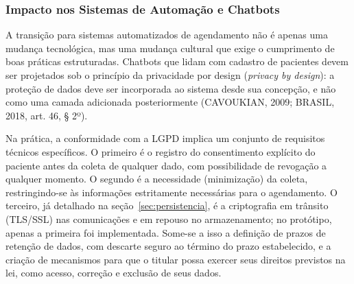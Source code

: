 \documentclass[12pt,a4paper]{extarticle}
\begin{document}
\subsubsection{Impacto nos Sistemas de Automação e Chatbots}
\label{sec:lgpd-impacto}

A transição para sistemas automatizados de agendamento não é apenas uma mudança tecnológica, mas uma mudança cultural que exige o cumprimento de boas práticas estruturadas. Chatbots que lidam com cadastro de pacientes devem ser projetados sob o princípio da privacidade por design (\textit{privacy by design}): a proteção de dados deve ser incorporada ao sistema desde sua concepção, e não como uma camada adicionada posteriormente (CAVOUKIAN, 2009; BRASIL, 2018, art. 46, § 2º).


Na prática, a conformidade com a LGPD implica um conjunto de requisitos técnicos específicos. O primeiro é o registro do consentimento explícito do paciente antes da coleta de qualquer dado, com possibilidade de revogação a qualquer momento. O segundo é a necessidade (minimização) da coleta, restringindo-se às informações estritamente necessárias para o agendamento. O terceiro, já detalhado na seção~\ref{sec:persistencia}, é a criptografia em trânsito (TLS/SSL) nas comunicações e em repouso no armazenamento; no protótipo, apenas a primeira foi implementada. Some-se a isso a definição de prazos de retenção de dados, com descarte seguro ao término do prazo estabelecido, e a criação de mecanismos para que o titular possa exercer seus direitos previstos na lei, como acesso, correção e exclusão de seus dados.
\end{document}
